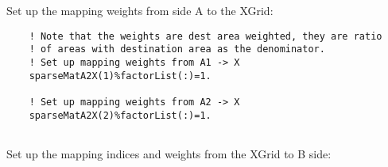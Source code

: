 
   Set up the mapping weights from side A to the XGrid: 

 \begin{verbatim}
    ! Note that the weights are dest area weighted, they are ratio
    ! of areas with destination area as the denominator.
    ! Set up mapping weights from A1 -> X
    sparseMatA2X(1)%factorList(:)=1.

    ! Set up mapping weights from A2 -> X
    sparseMatA2X(2)%factorList(:)=1.
 
\end{verbatim}
 

   Set up the mapping indices and weights from the XGrid to B side: 

